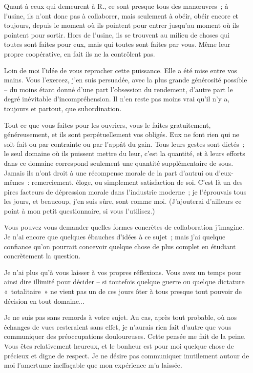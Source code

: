 \documentclass[french,twoside]{book} %
\begin{document}
Quant à ceux qui demeurent à R., ce sont presque tous des manœuvres ; à l'usine, ils n'ont donc pas à collaborer, mais seulement à obéir, obéir encore et toujours, depuis le moment où ils pointent pour entrer jusqu'au moment où ils pointent pour sortir. Hors de l'usine, ils se trouvent au milieu de choses qui toutes sont faites pour eux, mais qui toutes sont faites par vous. Même leur propre coopérative, en fait ils ne la contrôlent pas.\par
Loin de moi l'idée de vous reprocher cette puissance. Elle a été mise entre vos mains. Vous l'exercez, j'en suis persuadée, avec la plus grande générosité possible – du moins étant donné d'une part l'obsession du rendement, d'autre part le degré inévitable d'incompréhension. Il n'en reste pas moins vrai qu'il n'y a, toujours et partout, que subordination.\par
Tout ce que vous faites pour les ouvriers, vous le faites gratuitement, généreusement, et ils sont perpétuellement vos obligés. Eux ne font rien qui ne soit fait ou par contrainte ou par l'appât du gain. Tous leurs gestes sont dictés ; le seul domaine où ils puissent mettre du leur, c'est la quantité, et à leurs efforts dans ce domaine correspond seulement une quantité supplémentaire de sous. Jamais ils n'ont droit à une récompense morale de la part d'autrui ou d'eux-mêmes : remerciement, éloge, ou simplement satisfaction de soi. C'est là un des pires facteurs de dépression morale dans l'industrie moderne ; je l'éprouvais tous les jours, et beaucoup, j'en suis sûre, sont comme moi. (J'ajouterai d'ailleurs ce point à mon petit questionnaire, si vous l'utilisez.)\par
Vous pouvez vous demander quelles formes concrètes de collaboration j'imagine. Je n'ai encore que quelques ébauches d'idées à ce sujet ; mais j'ai quelque confiance qu'on pourrait concevoir quelque chose de plus complet en étudiant concrètement la question.\par
Je n'ai plus qu'à vous laisser à vos propres réflexions. Vous avez un temps pour ainsi dire illimité pour décider – si toutefois quelque guerre ou quelque dictature « totalitaire » ne vient pas un de ces jours ôter à tous presque tout pouvoir de décision en tout domaine...\par
Je ne suis pas sans remords à votre sujet. Au cas, après tout probable, où nos échanges de vues resteraient sans effet, je n'aurais rien fait d'autre que vous communiquer des préoccupations douloureuses. Cette pensée me fait de la peine. Vous êtes relativement heureux, et le bonheur est pour moi quelque chose de précieux et digne de respect. Je ne désire pas communiquer inutilement autour de moi l'amertume ineffaçable que mon expérience m'a laissée.\par
\end{document}

